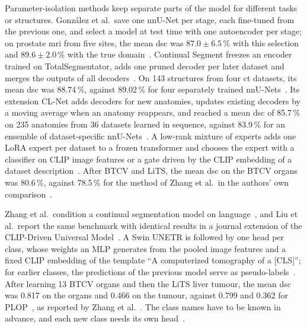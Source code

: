 Parameter-isolation methods keep separate parts of the model for different tasks or structures.
González et al.\ save one nnU-Net per stage, each fine-tuned from the previous one, and select a model at test time with one autoencoder per stage; on prostate \gls{mri} from five sites, the mean \gls{dsc} was $87.0 \pm 6.5$\,\% with this selection and $89.6 \pm 2.0$\,\% with the true domain~\cite{gonzalez2023wrongcontinuallearningmedical}.
Continual Segment freezes an encoder trained on TotalSegmentator, adds one pruned decoder per later dataset and merges the outputs of all decoders~\cite{ji2023continualsegmentsingleunified}.
On 143 structures from four \gls{ct} datasets, its mean \gls{dsc} was 88.74\,\%, against 89.02\,\% for four separately trained nnU-Nets~\cite{ji2023continualsegmentsingleunified}.
Its extension CL-Net adds decoders for new anatomies, updates existing decoders by a moving average when an anatomy reappears, and reached a mean \gls{dsc} of 85.7\,\% on 235 anatomies from 36 datasets learned in sequence, against 83.9\,\% for an ensemble of dataset-specific nnU-Nets~\cite{guo2025continuallearningdrivenmodelaccurate}.
A low-rank mixture of experts adds one LoRA expert per dataset to a frozen transformer and chooses the expert with a classifier on CLIP image features or a gate driven by the CLIP embedding of a dataset description~\cite{chen2024lowrankmoe}.
After BTCV and LiTS, the mean \gls{dsc} on the BTCV organs was 80.6\,\%, against 78.5\,\% for the method of Zhang et al.\ in the authors' own comparison~\cite{chen2024lowrankmoe}.

Zhang et al.\ condition a continual segmentation model on language~\cite{zhang2023continuallearningabdominalmultiorgan}, and Liu et al.\ report the same benchmark with identical results in a journal extension of the CLIP-Driven Universal Model~\cite{liu2024universalextensible}.
A Swin UNETR is followed by one head per class, whose weights an MLP generates from the pooled image features and a fixed CLIP embedding of the template ``A computerized tomography of a [CLS]''; for earlier classes, the predictions of the previous model serve as pseudo-labels~\cite{zhang2023continuallearningabdominalmultiorgan,liu2024universalextensible}.
After learning 13 BTCV organs and then the LiTS liver tumour, the mean \gls{dsc} was 0.817 on the organs and 0.466 on the tumour, against 0.799 and 0.362 for PLOP~\cite{douillard2021ploplearningforgettingcontinual}, as reported by Zhang et al.~\cite{zhang2023continuallearningabdominalmultiorgan}.
The class names have to be known in advance, and each new class needs its own head~\cite{zhang2023continuallearningabdominalmultiorgan,liu2024universalextensible}.


